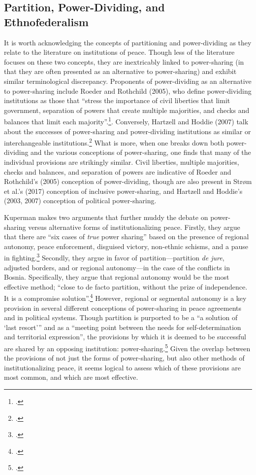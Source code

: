 \documentclass[12pt]{article}
\begin{document}
\subsection{Partition, Power-Dividing, and Ethnofederalism}
It is worth acknowledging the concepts of partitioning and power-dividing as they relate to the literature on institutions of peace. Though less of the literature focuses on these two concepts, they are inextricably linked to power-sharing (in that they are often presented as an alternative to power-sharing) and exhibit similar terminological discrepancy. Proponents of power-dividing as an alternative to power-sharing include Roeder and Rothchild (2005), who define power-dividing institutions as those that ``stress the importance of civil liberties that limit government, separation of powers that create multiple majorities, and checks and balances that limit each majority''.\footcite[52]{roeder_sustainable_2003}. Conversely, Hartzell and Hoddie (2007) talk about the successes of power-sharing and power-dividing institutions as similar or interchangeable institutions.\footcite[150-152]{hartzell_crafting_2007} What is more, when one breaks down both power-dividing and the various conceptions of power-sharing, one finds that many of the individual provisions are strikingly similar. Civil liberties, multiple majorities, checks and balances, and separation of powers are indicative of Roeder and Rothchild’s (2005) conception of power-dividing, though are also present in Strøm et al.’s (2017) conception of inclusive power-sharing, and Hartzell and Hoddie’s (2003, 2007) conception of political power-sharing. 

Kuperman makes two arguments that further muddy the debate on power-sharing versus alternative forms of institutionalizing peace. Firstly, they argue that there are ``six cases of \textit{true} power sharing'' based on the presence of regional autonomy, peace enforcement, disguised victory, non-ethnic schisms, and a pause in fighting.\footcite[emphasis added]{kuperman_power_2006} Secondly, they argue in favor of partition---partition \textit{de jure}, adjusted borders, and or regional autonomy---in the case of the conflicts in Bosnia. Specifically, they argue that regional autonomy would be the most effective method; ``close to de facto partition, without the prize of independence. It is a compromise solution''.\footcite{kuperman_power-sharing_2006} However, regional or segmental autonomy is a key provision in several different conceptions of power-sharing in peace agreements and in political systems. Though partition is purported to be a ``a solution of ‘last resort’'' and as a ``meeting point between the needs for self-determination and territorial expression'', the provisions by which it is deemed to be successful are shared by an opposing institution: power-sharing.\footcite[32]{berg_introduction:_2008, waterman_partitioned_1987} Given the overlap between the provisions of not just the forms of power-sharing, but also other methods of institutionalizing peace, it seems logical to assess which of these provisions are most common, and which are most effective.
\end{document}
